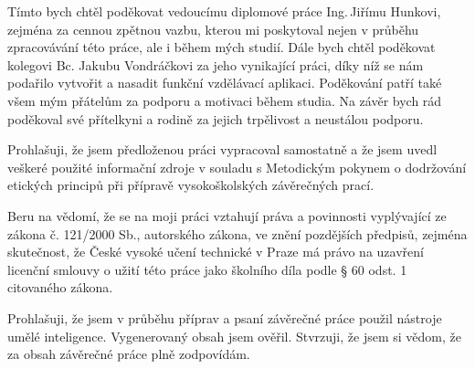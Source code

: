 \documentclass[czech,master,oneside]{ctufit-thesis}
\begin{document}
\frontmatter\frontmatterinit %

\thispagestyle{empty}\maketitle\thispagestyle{empty}\cleardoublepage %


\imprintpage %
\stopTOCentries

\begin{acknowledgmentpage}
    Tímto bych chtěl poděkovat vedoucímu diplomové práce Ing.\,Jiřímu Hunkovi, zejména za cennou zpětnou vazbu, kterou mi poskytoval nejen v průběhu zpracovávání této práce, ale i během mých studií. Dále bych chtěl poděkovat kolegovi Bc. Jakubu Vondráčkovi za jeho vynikající práci, díky níž se nám podařilo vytvořit a nasadit funkční vzdělávací aplikaci. Poděkování patří také všem mým přátelům za podporu a motivaci během studia. Na závěr bych rád poděkoval své přítelkyni a rodině za jejich trpělivost a neustálou podporu.
\end{acknowledgmentpage}


\begin{declarationpage}
Prohlašuji, že jsem předloženou práci vypracoval samostatně a že jsem uvedl veškeré použité informační zdroje v souladu s Metodickým pokynem o dodržování etických principů při přípravě vysokoškolských závěrečných prací.

Beru na vědomí, že se na moji práci vztahují práva a povinnosti vyplývající ze zákona č. 121/2000 Sb., autorského zákona, ve znění pozdějších předpisů, zejména skutečnost, že České vysoké učení technické v Praze má právo na uzavření licenční smlouvy o užití této práce jako školního díla podle § 60 odst. 1 citovaného zákona.

Prohlašuji, že jsem v průběhu příprav a psaní závěrečné práce použil nástroje umělé inteligence. Vygenerovaný obsah jsem ověřil. Stvrzuji, že jsem si vědom, že za obsah závěrečné práce plně zodpovídám.
\end{declarationpage}
\end{document}
